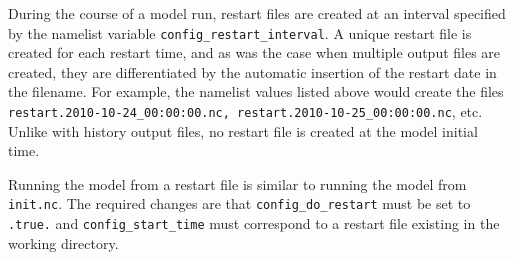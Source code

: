 During the course of a model run, restart files are created at an interval specified by the namelist variable {\tt config\_restart\_interval}.  A unique restart file is created for each restart time, and as was the case when multiple output files are created, they are differentiated by the automatic insertion of the restart date in the filename.  For example, the namelist values listed above would create the files {\tt restart.2010-10-24\_00:00:00.nc, restart.2010-10-25\_00:00:00.nc}, etc. Unlike with history output files, no restart file is created at the model initial time.

Running the model from a restart file is similar to running the model from {\tt init.nc}.  The required changes are that {\tt config\_do\_restart} must be set to {\tt .true.} and {\tt config\_start\_time} must correspond to a restart file existing in the working directory.

